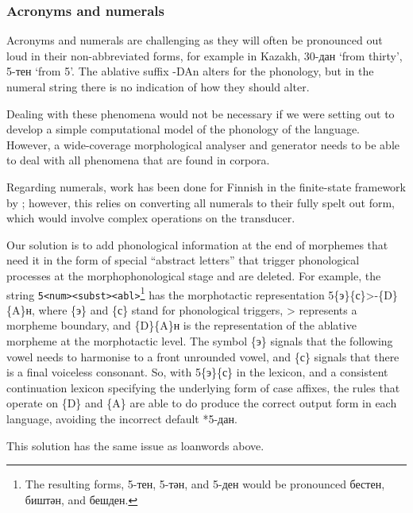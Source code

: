 \documentclass[a4paper,11pt,twocolumn]{article}
\begin{document}
\subsubsection{Acronyms and numerals}
Acronyms and numerals are challenging as they will often be pronounced out loud
   in their non-abbreviated forms, for example in Kazakh, 30-дан `from thirty', 5-тен `from 5'. The ablative
   suffix -DAn alters for the phonology, but in the numeral string there is no indication of how they should alter.

Dealing with these phenomena would not be necessary if we were setting out to develop a simple computational
model of the phonology of the language. However, a wide-coverage morphological analyser and generator needs to be 
able to deal with all phenomena that are found in corpora.

Regarding numerals, work has been done for Finnish in the finite-state framework by \citep{karttunen06}; however, this relies on converting all numerals to their fully spelt out form, which would involve complex operations 
on the transducer. 

Our solution is to add phonological information at the end of morphemes that need it in the form of special ``abstract letters'' that trigger phonological processes at the morphophonological stage and are deleted. For example, the string \texttt{5<num><subst><abl>}\footnote{The resulting forms, 5-тен, 5-тән, and 5-ден would be pronounced бестен, биштән, and бешден.} has
the morphotactic representation 5\{э\}\{с\}>-\{D\}\{A\}н, where \{э\} and \{с\} stand for phonological triggers, > represents a morpheme boundary, and \{D\}\{A\}н is the representation of the ablative morpheme at the morphotactic level.  The symbol \{э\} signals that the following vowel needs to harmonise to a front unrounded vowel, and \{с\} signals that there is a final voiceless consonant.  So, with 5\{э\}\{с\} in the lexicon, and a consistent continuation lexicon specifying the underlying form of case affixes, the rules that operate on \{D\} and \{A\} are able to do produce the correct output form in each language, avoiding the incorrect default *5-дан.


This solution has the same issue as loanwords above.
\end{document}

